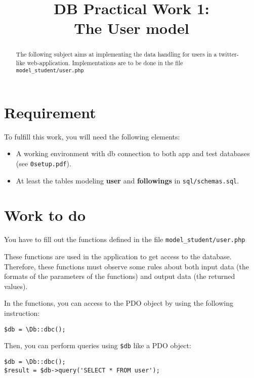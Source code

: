 \documentclass[twoside,a4paper,12pt]{article}
\title{DB Practical Work 1:\\The User model}
\date{}
\begin{document}
\maketitle

\begin{abstract}
  The following subject aims at implementing the data handling for users in a twitter-like web-application. Implementations are to be done in the file \texttt{model\_student/user.php}
\end{abstract}

\tableofcontents

\clearpage

\section{Requirement}
To fulfill this work, you will need the following elements:

\begin{itemize}
\item A working environment with db connection to both app and test databases (see \texttt{0setup.pdf}).
\item At least the tables modeling \textbf{user} and \textbf{followings} in \texttt{sql/schemas.sql}.
\end{itemize}

\section{Work to do}
You have to fill out the functions defined in the file \texttt{model\_student/user.php}

These functions are used in the application to get access to the database. Therefore, these functions must observe some rules about both input data (the formats of the parameters of the functions) and output data (the returned values).

In the functions, you can access to the PDO object by using the following instruction:

\begin{lstlisting}
$db = \Db::dbc();
\end{lstlisting}

Then, you can perform queries using \texttt{\$db} like a PDO object:
\begin{lstlisting}
$db = \Db::dbc();
$result = $db->query('SELECT * FROM user');
\end{lstlisting}
\end{document}
